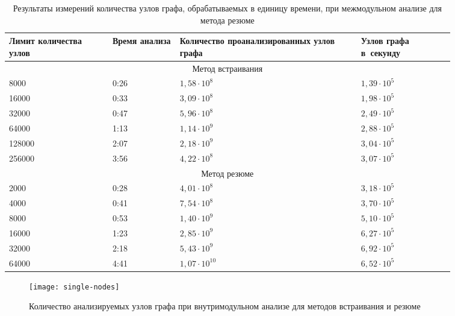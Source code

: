 \begin{table}
\renewcommand{\arraystretch}{1.2}
\begin{tabular}{| p{0.2\linewidth} | p{0.13\linewidth} | p{0.35\linewidth} | p{0.18\linewidth} |} 
\hline
Лимит количества узлов & Время анализа & Количество проанализированных узлов графа & Узлов графа в~секунду \\
\hline
\multicolumn{4}{|c|}{Метод встраивания} \\
\hline
\hline
8000      &   0:26       & $1,58 \cdot 10^8$  & $1,39 \cdot 10^5$ \\
\hline
16000     &  0:33        & $3,09 \cdot 10^8$  & $1,98 \cdot 10^5$ \\
\hline
32000     &  0:47        & $5,96 \cdot 10^8$  & $2,49 \cdot 10^5$ \\
\hline
64000     &  1:13        & $1,14 \cdot 10^9$  & $2,88 \cdot 10^5$ \\
\hline
128000    &   2:07       & $2,18 \cdot 10^9$  & $3,04 \cdot 10^5$ \\
\hline
256000    &   3:56       & $4,22 \cdot 10^8$  & $3,07 \cdot 10^5$ \\
\hline
\hline
\multicolumn{4}{|c|}{Метод резюме} \\
\hline
\hline
2000      &   0:28       & $4,01 \cdot 10^8$  & $3,18 \cdot 10^5$ \\
\hline
4000      &   0:41       & $7,54 \cdot 10^8$  & $3,70 \cdot 10^5$ \\
\hline
8000      &   0:53       & $1,40 \cdot 10^9$  & $5,10 \cdot 10^5$ \\
\hline
16000     &  1:23        & $2,85 \cdot 10^9$  & $6,27 \cdot 10^5$ \\
\hline
32000     &  2:18        & $5,43 \cdot 10^9$  & $6,92 \cdot 10^5$ \\
\hline
64000     &  4:41        & $1,07 \cdot 10^{10}$ & $6,52 \cdot 10^5$ \\
\hline
\hline

\end{tabular}
\caption{Результаты измерений количества узлов графа, обрабатываемых в единицу времени, при межмодульном анализе для метода резюме} \label{table:time-nodes-xtu}

\end{table}


\begin{figure}[h]
   \centering
   \texttt{[image: single-nodes]}
   \caption{Количество анализируемых узлов графа при внутримодульном анализе для методов встраивания и резюме}\label{pic:single-nodes}
\end{figure}

